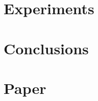 \documentclass[oneside,openright,titlepage,numbers=noenddot,headinclude,footinclude=true,cleardoublepage=empty,listof=totoc,paper=a4,fontsize=11pt,american,BCOR=5mm]{scrreprt}
\begin{document}
  \chapter{Experiments}\label{c:Experiments}
  
  
  \chapter{Conclusions}\label{c:Conclusions}
  
  
  \chapter{Paper}\label{c:Paper}
  
  
  
  
  
  \cleardoublepage
  \appendix
  
  \singlespacing
  
  \cleardoublepage
  
  \pagestyle{empty}
  \onehalfspacing
  
\end{document}
